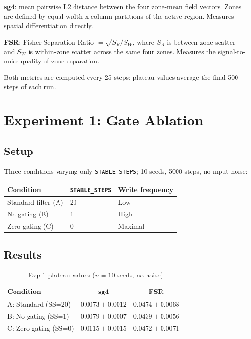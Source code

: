 \documentclass[11pt,twocolumn]{article}
\begin{document}
\textbf{sg4}: mean pairwise L2 distance between the four zone-mean field vectors.
Zones are defined by equal-width x-column partitions of the active region.
Measures spatial differentiation directly.

\textbf{FSR}: Fisher Separation Ratio $= \sqrt{S_B / S_W}$, where $S_B$ is
between-zone scatter and $S_W$ is within-zone scatter across the same four zones.
Measures the signal-to-noise quality of zone separation.

Both metrics are computed every 25 steps; plateau values average the final
500 steps of each run.

\section{Experiment 1: Gate Ablation}

\subsection{Setup}

Three conditions varying only \texttt{STABLE\_STEPS}; 10 seeds, 5000 steps,
no input noise:

\begin{center}
\begin{tabular}{lll}
\toprule
Condition & \texttt{STABLE\_STEPS} & Write frequency \\
\midrule
Standard-filter (A) & 20 & Low \\
No-gating (B)       & 1  & High \\
Zero-gating (C)     & 0  & Maximal \\
\bottomrule
\end{tabular}
\end{center}

\subsection{Results}

\begin{table}[h]
\centering
\caption{Exp 1 plateau values ($n=10$ seeds, no noise).}
\label{tab:exp1}
\begin{tabular}{lccc}
\toprule
Condition & sg4 & FSR \\
\midrule
A: Standard (SS=20) & $0.0073 \pm 0.0012$ & $0.0474 \pm 0.0068$ \\
B: No-gating (SS=1) & $0.0079 \pm 0.0007$ & $0.0439 \pm 0.0056$ \\
C: Zero-gating (SS=0)  & $0.0115 \pm 0.0015$ & $0.0472 \pm 0.0071$ \\
\bottomrule
\end{tabular}
\end{table}
\end{document}
